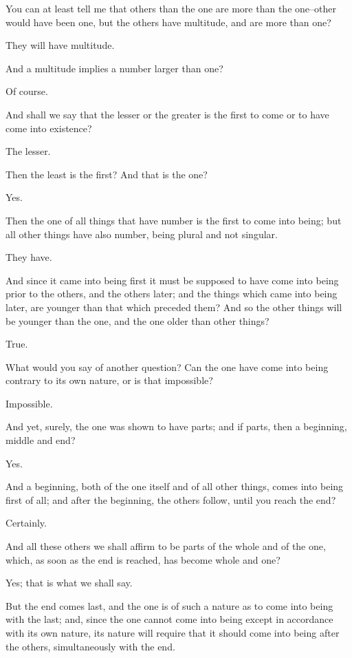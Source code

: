 You can at least tell me that others than the one are more than the
one--other would have been one, but the others have multitude, and are
more than one?

They will have multitude.

And a multitude implies a number larger than one?

Of course.

And shall we say that the lesser or the greater is the first to come or
to have come into existence?

The lesser.

Then the least is the first? And that is the one?

Yes.

Then the one of all things that have number is the first to come into
being; but all other things have also number, being plural and not
singular.

They have.

And since it came into being first it must be supposed to have come into
being prior to the others, and the others later; and the things which
came into being later, are younger than that which preceded them? And
so the other things will be younger than the one, and the one older than
other things?

True.

What would you say of another question? Can the one have come into being
contrary to its own nature, or is that impossible?

Impossible.

And yet, surely, the one was shown to have parts; and if parts, then a
beginning, middle and end?

Yes.

And a beginning, both of the one itself and of all other things, comes
into being first of all; and after the beginning, the others follow,
until you reach the end?

Certainly.

And all these others we shall affirm to be parts of the whole and of the
one, which, as soon as the end is reached, has become whole and one?

Yes; that is what we shall say.

But the end comes last, and the one is of such a nature as to come into
being with the last; and, since the one cannot come into being except in
accordance with its own nature, its nature will require that it should
come into being after the others, simultaneously with the end.

